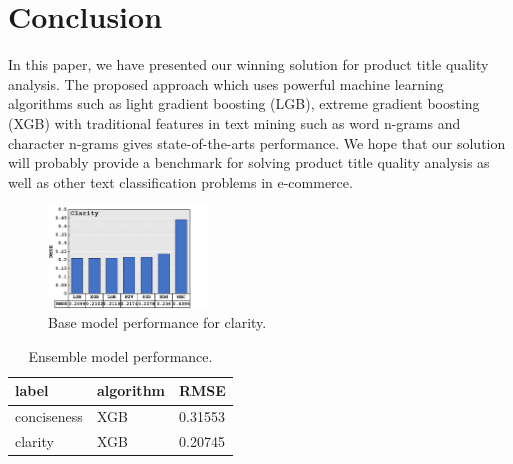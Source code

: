 \documentclass[sigconf]{acmart}
\begin{document}
\section{Conclusion}
In this paper, we have presented our winning solution for product title quality analysis. The proposed approach which uses powerful machine learning algorithms such as light gradient boosting (LGB), extreme gradient boosting (XGB) with traditional features in text mining such as word n-grams and character n-grams gives state-of-the-arts performance. We hope that our solution will probably provide a benchmark for solving product title quality analysis as well as other text classification problems in e-commerce.
\begin{figure}
  \centering
    \includegraphics[width=0.38\textwidth]{clarity_base_model_rmse_new}
  \caption{Base model performance for clarity.}
  \label{fig:cla_base_model_rmse}
\end{figure}
\begin{table}[]
\small
\centering
\caption{Ensemble model performance.}
\label{tbl:ensemble_model_rmse}
\begin{tabular}{l l l}
\hline
\textbf{label} & \textbf{algorithm} & \textbf{RMSE} \\ \hline
conciseness & XGB & 0.31553 \\
clarity & XGB & 0.20745 \\

\hline
\end{tabular}
\end{table}
\end{document}
